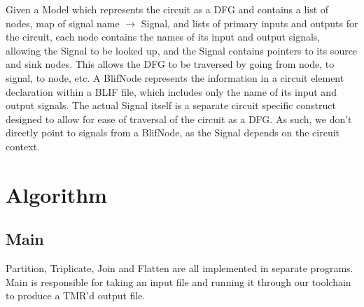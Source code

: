 \documentclass[12pt,final,oneside]{dwThesis} %
\renewcommand\algorithmiccomment[1]{%
  \hfill$\triangleright$\ \parbox[t]{.25\linewidth}{#1}%
}
\begin{document}
\renewcommand\algorithmiccomment[1]{%
  \hfill$\triangleright$\ \parbox[t]{.25\linewidth}{#1}%
}
   Given a Model which represents the circuit as a DFG and contains a list of nodes, map of signal
   name $\to$ Signal, and lists of primary inputs and outputs for the circuit,
   each node contains the names of its input and output signals, allowing the
   Signal to be looked up, and the Signal contains pointers to its source and
   sink nodes.  This allows the DFG to be traversed by going from node, to
   signal, to node, etc.  A BlifNode represents the information in a circuit
   element declaration within a \gls{BLIF} file, which includes only the name
   of its input and output signals. The actual Signal itself is a separate
   circuit specific construct designed to allow for ease of traversal of the
   circuit as a \gls{DFG}.  As such, we don't directly point to signals from a
   BlifNode, as the Signal depends on the circuit context.  

   \newpage 
   \section{Algorithm}
   \label{secAlgorithm} 
   \subsection{Main}

   Partition, Triplicate, Join and Flatten are all implemented in separate
   programs. Main is responsible for taking an input file and running it
   through our toolchain to produce a TMR'd output file.
\end{document}
